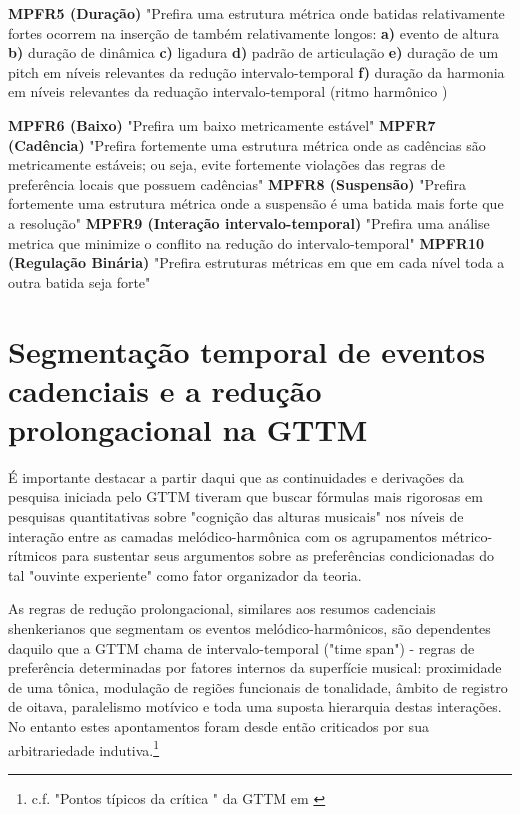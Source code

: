 \documentclass[
	12pt,				%
	openright,			%
	twoside,			%
	a4paper,			%
	english,			%
	french,				%
	spanish,			%
	brazil				%
	]{abntex2}
\begin{document}
\begin{citacao}
\textbf{MPFR5 (Duração)} "Prefira uma estrutura métrica onde batidas relativamente fortes ocorrem na inserção de também relativamente longos: 
\textbf{a)} evento de altura 
\textbf{b)} duração de dinâmica 
\textbf{c)} ligadura 
\textbf{d)} padrão de articulação 
\textbf{e)} duração de um pitch em níveis relevantes da redução intervalo-temporal 
\textbf{f)} duração da harmonia em níveis relevantes  da reduação intervalo-temporal (ritmo harmônico )
\end{citacao}

\begin{citacao}
\textbf{MPFR6 (Baixo)} "Prefira um baixo metricamente estável" 
\textbf{MPFR7 (Cadência)} "Prefira fortemente uma estrutura métrica onde as cadências são metricamente estáveis; ou seja, evite fortemente violações das regras de preferência locais que possuem cadências" 
\textbf{MPFR8 (Suspensão)} "Prefira fortemente uma estrutura métrica onde a suspensão é uma batida mais forte que a resolução" 
\textbf{MPFR9 (Interação intervalo-temporal)} "Prefira uma análise metrica que minimize o conflito na redução do intervalo-temporal" 
\textbf{MPFR10 (Regulação Binária)} "Prefira estruturas métricas em que em cada nível toda a outra batida seja forte" 
 \cite{lerdahl1983generative}
\end{citacao}



\section{Segmentação temporal de eventos cadenciais e a redução prolongacional na GTTM}


É importante destacar a partir daqui que as continuidades e derivações da pesquisa iniciada pelo GTTM tiveram que buscar fórmulas mais rigorosas em pesquisas quantitativas sobre "cognição das alturas musicais"\cite{krumhansl1990cognitive} nos níveis de interação entre as camadas melódico-harmônica com os agrupamentos métrico-rítmicos para sustentar seus argumentos sobre as preferências condicionadas do tal "ouvinte experiente"\cite[pg. 118]{lerdahl1983generative} como fator organizador da teoria. 

As regras de redução prolongacional, similares aos resumos cadenciais shenkerianos que segmentam os eventos melódico-harmônicos, são dependentes daquilo que a GTTM chama de intervalo-temporal ("time span") - regras de preferência determinadas por fatores internos da superfície musical: proximidade de uma tônica, modulação de regiões funcionais de tonalidade, âmbito de registro de oitava, paralelismo motívico e toda uma suposta hierarquia destas interações. No entanto estes apontamentos foram desde então criticados por sua arbitrariedade indutiva.\footnote{ c.f. "Pontos típicos da crítica " da GTTM em \cite[pg. 35]{hansen2011legacy} }
\end{document}
